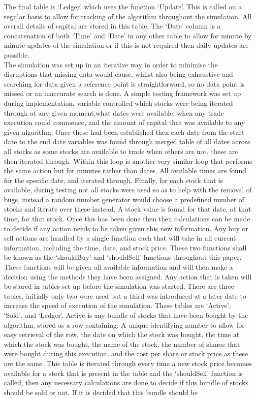 \documentclass[conference]{IEEEtran}
\begin{document}
The final table is `Ledger' which uses the function `Update'. This is called on a regular basis to allow for tracking of the algorithm throughout the simulation. All overall details of capital are stored in this table. The `Date' column is a concatenation of both `Time' and `Date' in any other table to allow for minute by minute updates of the simulation or if this is not required then daily updates are possible.\\

\iffalse
The simulation was set up in an iterative way in order to minimise the disruptions that missing data would cause, whilst also being exhaustive and searching for data given a reference point is straightforward, so no data point is missed or an inaccurate search is done. A simple testing framework was set up during implementation, variable controlled which stocks were being iterated through at any given moment,what dates were available, when any trade execution could commence, and the amount of capital that was available to any given algorithm. Once these had been established then each date from the start date to the end date variables was found through merged table of all dates across all stocks as some stocks are available to trade when others are not, these are then iterated through. Within this loop is another very similar loop that performs the same action but for minutes rather than dates. All available times are found for the specific date, and iterated through. Finally, for each stock that is available, during testing not all stocks were used so as to help with the removal of bugs, instead a random number generator would choose a predefined number of stocks and iterate over these instead. A stock value is found for that date, at that time, for that stock. Once this has been done then then calculations can be made to decide if any action needs to be taken given this new information. Any buy or sell actions are handled by a single function each that will take in all current information, including the time, date, and stock price. These two functions shall be known as the `shouldBuy' and `shouldSell' functions throughout this paper. These functions will be given all available information and will then make a decision using the methods they have been assigned. Any action that is taken will be stored in tables set up before the simulation was started. There are three tables, initially only two were used but a third was introduced at a later date to increase the speed of execution of the simulation. These tables are `Active', `Sold', and `Ledger'. Active is any bundle of stocks that have been bought by the algorithm, stored as a row containing; A unique identifying number to allow for easy retrieval of the row, the date on which the stock was bought, the time at which the stock was bought, the name of the stock, the number of shares that were bought during this execution, and the cost per share or stock price as these are the same. This table is iterated through every time a new stock price becomes available for a stock that is present in the table and the `shouldSell' function is called, then any necessary calculations are done to decide if this bundle of stocks should be sold or not. If it is decided that this bundle should be 
\end{document}
